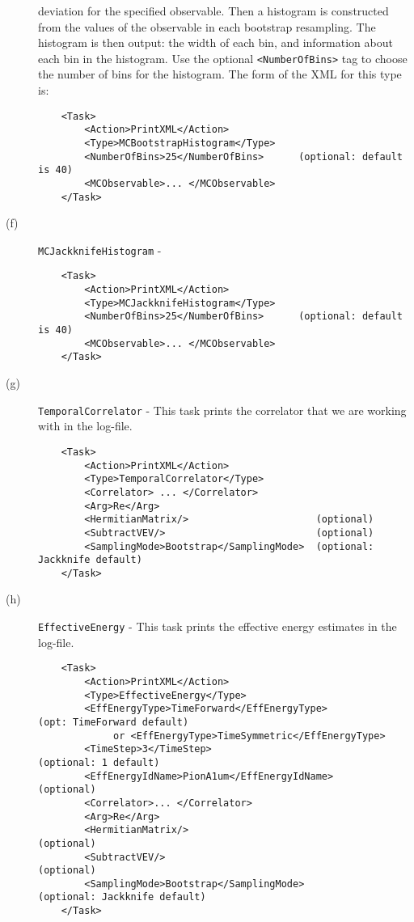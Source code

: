 \documentclass[12pt]{article}
\newcommand{\vb}{\texttt}
\begin{document}
\begin{description}
  deviation for the specified observable.
  Then a histogram is constructed from the values of the observable in each bootstrap resampling.
  The histogram is then output: the width of each bin, and information about each bin in the histogram.
  Use the optional \vb{<NumberOfBins>} tag to choose the number of bins for the histogram.
  The form of the XML for this type is:
\begin{verbatim}
    <Task>
        <Action>PrintXML</Action>
        <Type>MCBootstrapHistogram</Type>
        <NumberOfBins>25</NumberOfBins>      (optional: default is 40)
        <MCObservable>... </MCObservable>
    </Task>
\end{verbatim}
\item[(f)] \vb{MCJackknifeHistogram} -
\begin{verbatim}
    <Task>
        <Action>PrintXML</Action>
        <Type>MCJackknifeHistogram</Type>
        <NumberOfBins>25</NumberOfBins>      (optional: default is 40)
        <MCObservable>... </MCObservable>
    </Task>
\end{verbatim}
\item[(g)] \vb{TemporalCorrelator} - This task prints the correlator
that we are working with in the log-file.
\begin{verbatim}
    <Task>
        <Action>PrintXML</Action>
        <Type>TemporalCorrelator</Type>
        <Correlator> ... </Correlator>
        <Arg>Re</Arg>
        <HermitianMatrix/>                      (optional)
        <SubtractVEV/>                          (optional)
        <SamplingMode>Bootstrap</SamplingMode>  (optional: Jackknife default)
    </Task>
\end{verbatim}

\item[(h)] \vb{EffectiveEnergy} -
This task prints the effective energy estimates in the log-file.

\begin{verbatim}
    <Task>
        <Action>PrintXML</Action>
        <Type>EffectiveEnergy</Type>
        <EffEnergyType>TimeForward</EffEnergyType>            (opt: TimeForward default)
             or <EffEnergyType>TimeSymmetric</EffEnergyType>
        <TimeStep>3</TimeStep>                                (optional: 1 default)
        <EffEnergyIdName>PionA1um</EffEnergyIdName>           (optional)
        <Correlator>... </Correlator> 
        <Arg>Re</Arg>
        <HermitianMatrix/>                                    (optional)
        <SubtractVEV/>                                        (optional)
        <SamplingMode>Bootstrap</SamplingMode>                (optional: Jackknife default)
    </Task>   
\end{verbatim}
  

\end{description}
\end{document}
